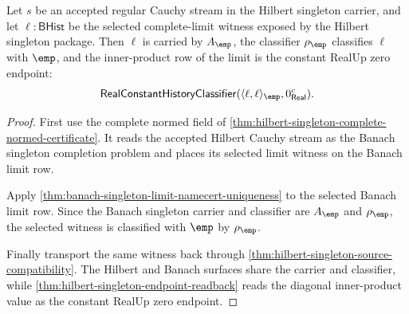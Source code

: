 \begin{theorem}
\label{thm:hilbert-singleton-limit-inner-product-carrier}
Let $s$ be an accepted regular Cauchy stream in the Hilbert singleton carrier,
and let $\ell:\mathsf{BHist}$ be the selected complete-limit witness exposed by
the Hilbert singleton package. Then $\ell$ is carried by $A_{\emp}$, the
classifier $\rho_{\emp}$ classifies $\ell$ with $\emp$, and the inner-product
row of the limit is the constant RealUp zero endpoint:
$$
\mathsf{RealConstantHistoryClassifier}
  (\langle \ell,\ell\rangle_{\emp},0_{\mathsf{Real}}^{c}).
$$
\end{theorem}
\begin{proof}
First use the complete normed field of
\autoref{thm:hilbert-singleton-complete-normed-certificate}. It reads the
accepted Hilbert Cauchy stream as the Banach singleton completion problem and
places its selected limit witness on the Banach limit row.

Apply \autoref{thm:banach-singleton-limit-namecert-uniqueness} to the selected
Banach limit row. Since the Banach singleton carrier and classifier are
$A_{\emp}$ and $\rho_{\emp}$, the selected witness is classified with $\emp$
by $\rho_{\emp}$.

Finally transport the same witness back through
\autoref{thm:hilbert-singleton-source-compatibility}. The Hilbert and Banach
surfaces share the carrier and classifier, while
\autoref{thm:hilbert-singleton-endpoint-readback} reads the diagonal
inner-product value as the constant RealUp zero endpoint.
\end{proof}

